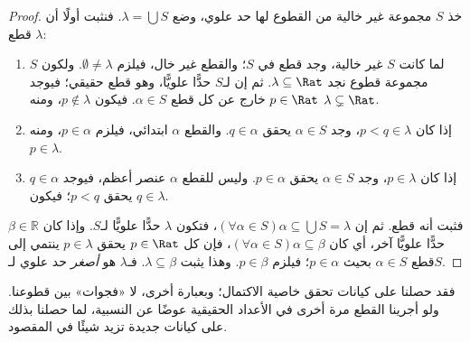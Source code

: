 \documentclass[../../../include/open-logic-section]{subfiles}
\begin{document}
\begin{proof}
خذ $S$ مجموعة غير خالية من القطوع لها حد علوي، وضع $\lambda
= \bigcup S$.
فنثبت أولًا أن $\lambda$ قطع:
\begin{enumerate}
\item لما كانت $S$ غير خالية، وجد قطع في $S$؛ والقطع غير خال، فيلزم $\emptyset \neq \lambda$. ولكون $S$ مجموعة قطوع نجد $\lambda \subseteq \Rat$. ثم إن لـ$S$ حدًّا علويًّا، وهو قطع حقيقي؛ فيوجد $p \in
\Rat$ خارج عن كل قطع $ \alpha \in S$. فيكون $p\notin \lambda$، ومنه $\lambda \subsetneq \Rat$.
\item إذا كان $p < q \in \lambda$، وجد $ \alpha \in S$ يحقق $q \in \alpha$. والقطع $\alpha$ ابتدائي، فيلزم $p \in \alpha$، ومنه $p \in \lambda$.
\item إذا كان $p \in \lambda$، وجد $ \alpha \in S$ يحقق $p \in
\alpha$. وليس للقطع $\alpha$ عنصر أعظم، فيوجد $q \in \alpha$ يحقق $p < q$؛ فيكون $q \in \lambda$.
\end{enumerate}
فثبت أنه قطع. ثم إن
$(\forall \alpha \in S)\alpha \subseteq \bigcup S = \lambda$، فتكون $\lambda$ حدًّا علويًّا لـ$S$. وإذا كان $\beta \in \mathbb{R}$ حدًّا علويًّا آخر، أي كان $(\forall \alpha \in S)\alpha \subseteq \beta$، فإن كل $p \in \Rat$ يحقق $p \in \lambda$ ينتمي إلى قطع $ \alpha \in S$ بحيث $p \in \alpha$؛ فيلزم $p \in \beta$. وهذا يثبت $\lambda
\subseteq \beta$. فـ$\lambda$ هو \emph{أصغر} حد علوي لـ$S$.
\end{proof}

فقد حصلنا على كيانات تحقق خاصية الاكتمال؛ وبعبارة أخرى، لا «فجوات» بين قطوعنا. ولو أجرينا القطع مرة أخرى في الأعداد الحقيقية عوضًا عن النسبية، لما حصلنا بذلك على كيانات جديدة تزيد شيئًا في المقصود.
\end{document}
